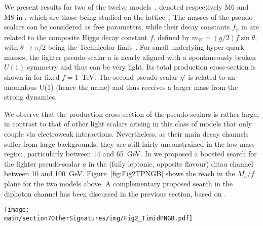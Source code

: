 We present results for two of the twelve models~\cite{Ferretti:2014qta,Barnard:2013zea}, denoted respectively M6 and M8 in , which are those being studied on the lattice~\cite{Bennett:2017kga,Ayyar:2018zuk}. 
The masses of the pseudo-scalars can be considered as free parameters, while their decay constants $f_\phi$ in  are related to the composite Higgs decay constant $f$, defined by $m_W = (g/2) f \sin \theta$, with $\theta \to \pi/2$ being the Technicolor limit~\cite{Belyaev:2016ftv,Cacciapaglia:2017iws}.
For small underlying hyper-quark masses, the lighter pseudo-scalar $a$ is nearly aligned with a spontaneously broken $U(1)$ symmetry and thus can be very light. Its total production cross-section is shown in  for fixed $f=1$~TeV. The second pseudo-scalar $\eta'$ is related to an anomalous U(1) (hence the name) and thus receives a larger mass from the strong dynamics.


We observe that the production cross-section of the pseudo-scalars is rather large, in contrast to that of other light scalars arising in this class of models that only couple via electroweak interactions. Nevertheless, as their main decay channels suffer from large backgrounds, they are still fairly unconstrained in the low mass region, particularly between 14 and 65~GeV. 
In  we proposed a boosted search for the lighter pseudo-scalar $a$ in the (fully leptonic, opposite flavour) ditau channel between 10 and 100~GeV.  Figure~\ref{fig:Fig2TPNGB} shows the reach in the $M_a/f$ plane for the two models above. A complementary proposed search in the diphoton channel has been discussed in the previous section, based on .

\begin{figure*}[t] 
\begin{center}
\texttt{[image: \\main/section7OtherSignatures/img/Fig2\_TimidPNGB.pdf]} 
\end{center}
\caption{\label{fig:Fig2TPNGB} Reach of the ditau search for the two
models M6 (left) and M8 (right), compared to the existing bounds (gray
lines). The existing bounds indicate the strongest exclusion amongst those
arising from dimuon searches~\cite{Chatrchyan:2012am}, diphoton searches~\cite{Aad:2014ioa,CMS:2017yta}, and BSM decay width
of the Higgs~\cite{Khachatryan:2016vau}. (The bounds from , obtained adapting the analysis of  to these models, turn out to be subleading.) We have also indicated the current bounds obtained by adapting the results in  for diphotons (green).
The projected reach is computed at 14 TeV using the HL-LHC detector simulation, for a luminosity of 300 (blue) and 3000 (red) $\text{fb}^{-1}$, and two distinct cuts on $\Delta R_{\mu e}$.}


\end{figure*}

